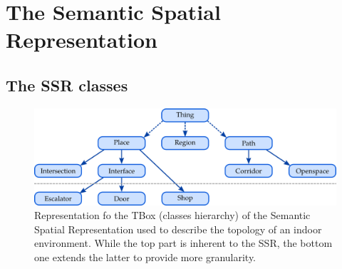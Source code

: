 



\section{The Semantic Spatial Representation}

\subsection{The SSR classes}

\begin{figure}[ht!]
\centering
\includegraphics[scale=0.4]{figures/chapter3/ssr_tbox.png}
\caption{\label{fig:chap3_tbox} Representation fo the TBox (classes hierarchy) of the Semantic Spatial Representation used to describe the topology of an indoor environment. While the top part is inherent to the SSR, the bottom one extends the latter to provide more granularity.}
\end{figure}

